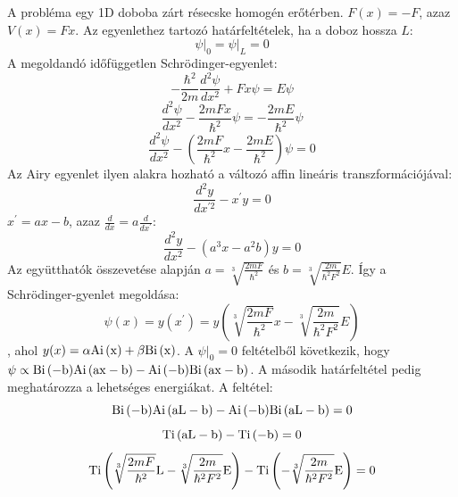 A probléma egy 1D doboba zárt résecske homogén erőtérben. $F(x)=-F$, azaz $V(x) = Fx$.
	Az egyenlethez tartozó határfeltételek, ha a doboz hossza $L$:
	\begin{equation}
		\psi \big\rvert_0 = \psi \big \rvert_L = 0
	\end{equation}
	A megoldandó időfüggetlen Schrödinger-egyenlet:
	\begin{equation}
		-\frac{\hbar^2}{2m}\frac{d^2\psi}{dx^2} + Fx\psi = E\psi
	\end{equation}
	\begin{equation}
		\frac{d^2\psi}{dx^2} - \frac{2mFx}{\hbar^2}\psi = -\frac{2mE}{\hbar^2}\psi
	\end{equation}
	\begin{equation}
		\frac{d^2\psi}{dx^2} - \left(\frac{2mF}{\hbar^2}x - \frac{2mE}{\hbar^2}\right)\psi = 0
	\end{equation}
	Az Airy egyenlet ilyen alakra hozható a változó affin lineáris transzformációjával:
	\begin{equation}
		\frac{d^2y}{dx^{\prime 2}} - x^\prime y = 0
	\end{equation}
	$x^\prime = ax - b$, azaz $\frac{d}{dx} = a\frac{d}{dx^\prime}$:
	\begin{equation}
		\frac{d^2y}{dx^2} - \left(a^3x - a^2b\right)y = 0
	\end{equation}
	Az együtthatók összevetése alapján $a = \sqrt[3]{\frac{2mF}{\hbar^2}}$ és $b = \sqrt[3]{\frac{2m}{\hbar^2F^2}}E$. Így a Schrödinger-gyenlet megoldása:
	\begin{equation}
		\psi(x) = y(x^\prime) = y\left(\sqrt[3]{\frac{2mF}{\hbar^2}}x - \sqrt[3]{\frac{2m}{\hbar^2F^2}}E\right)
	\end{equation}
	, ahol $y(x) = \alpha \mathrm{Ai\left(x\right)} + \beta \mathrm{Bi\left(x\right)}$.
	A $\psi \big\rvert_0 = 0$ feltételből következik, hogy $\psi \propto \mathrm{Bi\left(-b\right)}\mathrm{Ai\left(ax-b\right)} - \mathrm{Ai\left(-b\right)}\mathrm{Bi\left(ax-b\right)}$. A második határfeltétel pedig meghatározza a lehetséges energiákat. A feltétel:
	\begin{equation}
		\mathrm{Bi\left(-b\right)}\mathrm{Ai\left(aL-b\right)} - \mathrm{Ai\left(-b\right)}\mathrm{Bi\left(aL-b\right)} = 0
	\end{equation}
	\begin{equation}
		\label{box_energiaszintek_egyenlet}
		\mathrm{Ti\left(aL-b\right)} - \mathrm{Ti\left(-b\right)} = 0
	\end{equation}
	\begin{equation}
		\mathrm{Ti\left(\sqrt[3]{\frac{2mF}{\hbar^2}}L - \sqrt[3]{\frac{2m}{\hbar^2F^2}}E\right)} - \mathrm{Ti\left(-\sqrt[3]{\frac{2m}{\hbar^2F^2}}E\right)} = 0
	\end{equation}
